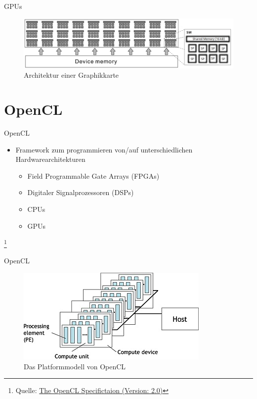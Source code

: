 \documentclass[10pt]{beamer}
\let\svthefootnote\thefootnote
\begin{document}
\begin{frame}{GPUs}
  \begin{figure}
    \centering
    \includegraphics[width=\linewidth]{figures/fg-gpu_architecture.png}
    \caption{Architektur einer Graphikkarte}
  \end{figure}
\end{frame}

\section{OpenCL}

\begin{frame}{OpenCL}
  \begin{itemize}
    \item Framework zum programmieren von/auf unterschiedlichen
          Hardwarearchitekturen
    \begin{itemize}
      \item Field Programmable Gate Arrays (FPGAs)
      \item Digitaler Signalprozessoren (DSPs)
      \item CPUs
      \item GPUs
    \end{itemize}
  \end{itemize}

  \footnotesize
  \let\thefootnote\relax\footnote{Quelle: \href{https://www.khronos.org/registry/OpenCL/specs/opencl-2.0.pdf}{The OpenCL Specifictaion (Version: 2.0)}}
  \addtocounter{footnote}{-1}\let\thefootnote\svthefootnote\relax
  \normalsize
\end{frame}

\begin{frame}{OpenCL}
  \begin{figure}
    \centering
    \includegraphics[width=\linewidth]{figures/fg-opencl-platform-model.png}
    \caption{Das Platformmodell von OpenCL\footnotemark[1]}
  \end{figure}

  \footnotesize
  \normalsize
\end{frame}
\end{document}
